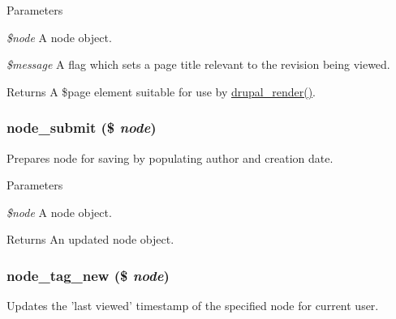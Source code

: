 \begin{DoxyParams}{Parameters}
\item[{\em \$node}]A node object. \item[{\em \$message}]A flag which sets a page title relevant to the revision being viewed.\end{DoxyParams}
\begin{DoxyReturn}{Returns}
A \$page element suitable for use by \hyperlink{common_8inc_a05798b44e8d6c496d4bee5cc32fa7851}{drupal\_\-render()}. 
\end{DoxyReturn}
\hypertarget{node_8module_ac61b7803b7fbcdb8e03cedc6138e3145}{
\subsubsection[{node\_\-submit}]{\setlength{\rightskip}{0pt plus 5cm}node\_\-submit (\$ {\em node})}}
\label{node_8module_ac61b7803b7fbcdb8e03cedc6138e3145}
Prepares node for saving by populating author and creation date.


\begin{DoxyParams}{Parameters}
\item[{\em \$node}]A node object.\end{DoxyParams}
\begin{DoxyReturn}{Returns}
An updated node object. 
\end{DoxyReturn}
\hypertarget{node_8module_aece74434cfb1fff50a99138d10b10f6a}{
\subsubsection[{node\_\-tag\_\-new}]{\setlength{\rightskip}{0pt plus 5cm}node\_\-tag\_\-new (\$ {\em node})}}
\label{node_8module_aece74434cfb1fff50a99138d10b10f6a}
Updates the 'last viewed' timestamp of the specified node for current user.


